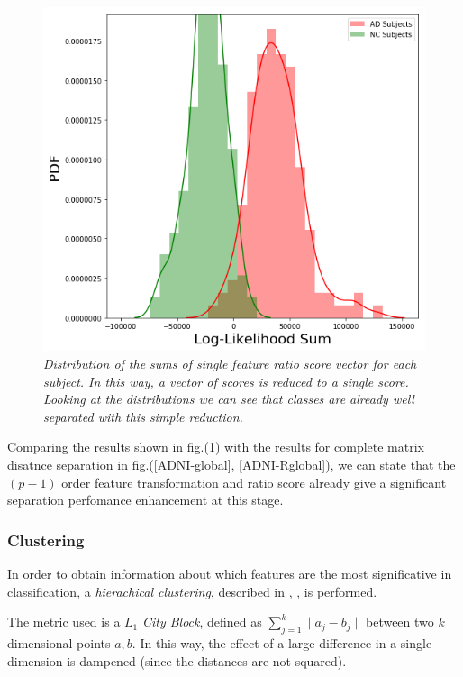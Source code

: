 \documentclass[12pt,openright,twoside,a4paper]{book}
\begin{document}
\begin{figure}[!h]
\centering
\includegraphics[scale=0.5]{diff-logpdf-dist}
\caption{\textit{Distribution of the sums of single feature ratio score vector for each subject. In this way, a vector of scores is reduced to a single score. Looking at the distributions we can see that classes are already well separated with this simple reduction.}}
\label{ADNI-sfsum}
\end{figure}

Comparing the results shown in fig.(\ref{ADNI-sfsum}) with the results for complete matrix disatnce separation in fig.(\ref{ADNI-global}, \ref{ADNI-Rglobal}), we can state that the $(p-1)$ order feature transformation and ratio score already give a significant separation perfomance enhancement at this stage.

\subsubsection*{Clustering}

In order to obtain information about which features are the most significative in classification, a \textit{hierachical clustering}, described in \cite{cluster}, \cite{cluster2},  is performed.
\vspace{5mm}

The metric used is a $L_1$ \textit{City Block}, defined as $\sum_{j=1}^k \mid a_j - b_j \mid $ between two $k$ dimensional points $a,b$. In this way, the effect of a large difference in a single dimension is dampened (since the distances are not squared).
\end{document}
